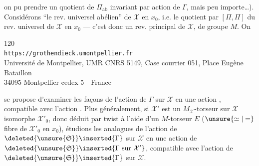 on  pu prendre un quotient de $\Pi_{\mathrm{ab}}$ invariant par
action de $\Gamma$, mais peu importe\ldots).
Considérons ``le rev. universel abélien''  de
$\mathcal X$ en $x_0$, i.e. le quotient par $[\Pi,\Pi]$ du rev. universel de
$\mathcal X$ en $x_0$ --- c'est donc un rev. principal de $\mathcal X$, de
groupe $M$. On


\begin{center}
\small
120\\
\texttt{https://grothendieck.umontpellier.fr}\\
Université de Montpellier, UMR CNRS 5149, Case courrier 051, Place Eugène Bataillon\\
34095 Montpellier cedex 5 - France
\end{center}


se propose d'examiner les façons de 
l'action de $\Gamma$ sur $\mathcal X$  en une
action , compatible
avec l'action 
.
Plus généralement, si $\mathcal X'$ est un $M_{\mathcal X}$-torseur sur
$\mathcal X$ isomorphe  $\mathcal X'_0$, donc déduit
 par twist à l'aide
d'un $M$-torseur $E$ ($\unsure{\simeq|=}$ fibre de $\mathcal X'_0$ en $x_0$),
étudions les  analogues de l'action
de $\deleted{\unsure{\mathfrak S}}\inserted{\Gamma}$ sur $\mathcal X$ en une
action de $\deleted{\unsure{\mathfrak S}}\inserted{\Gamma\text{ sur }\mathcal X'}$,
compatible avec l'action de
$\deleted{\unsure{\mathfrak S}}\inserted{\Gamma}$ sur $\mathcal X$.


